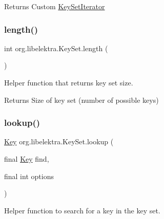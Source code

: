 \begin{DoxyReturn}{Returns}
Custom \hyperlink{classorg_1_1libelektra_1_1KeySetIterator}{Key\+Set\+Iterator} 
\end{DoxyReturn}
\mbox{\label{classorg_1_1libelektra_1_1KeySet_aac3920fa38179de07bcd242207915540}} 
\subsubsection{\texorpdfstring{length()}{length()}}
{\footnotesize\ttfamily int org.\+libelektra.\+Key\+Set.\+length (\begin{DoxyParamCaption}{ }\end{DoxyParamCaption})\hspace{0.3cm}{\ttfamily [inline]}}



Helper function that returns key set size. 

\begin{DoxyReturn}{Returns}
Size of key set (number of possible keys) 
\end{DoxyReturn}
\mbox{\label{classorg_1_1libelektra_1_1KeySet_a6fb319a768b1cb43464154a93f9a2e93}} 
\subsubsection{\texorpdfstring{lookup()}{lookup()}\hspace{0.1cm}{\footnotesize\ttfamily [1/4]}}
{\footnotesize\ttfamily \hyperlink{classorg_1_1libelektra_1_1Key}{Key} org.\+libelektra.\+Key\+Set.\+lookup (\begin{DoxyParamCaption}\item[{final \hyperlink{classorg_1_1libelektra_1_1Key}{Key}}]{find,  }\item[{final int}]{options }\end{DoxyParamCaption})\hspace{0.3cm}{\ttfamily [inline]}}



Helper function to search for a key in the key set. 


